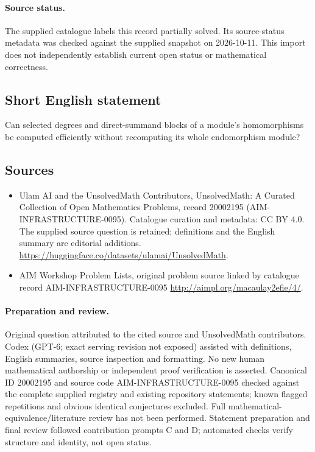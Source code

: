\documentclass[11pt]{article}
\begin{document}
\paragraph{Source status.}
The supplied catalogue labels this record partially solved. Its source-status metadata was checked against the supplied snapshot on 2026-10-11. This import does not independently establish current open status or mathematical correctness.
\subsection{Short English statement}
Can selected degrees and direct-summand blocks of a module's homomorphisms be computed efficiently without recomputing its whole endomorphism module?
\subsection{Sources}
\begin{itemize}
\item[\hypertarget{source:20002195:1}{S1}] Ulam AI and the UnsolvedMath Contributors, UnsolvedMath: A Curated Collection of Open Mathematics Problems, record 20002195 (AIM-INFRASTRUCTURE-0095). Catalogue curation and metadata: CC BY 4.0. The supplied source question is retained; definitions and the English summary are editorial additions.
\url{https://huggingface.co/datasets/ulamai/UnsolvedMath}.
\item[\hypertarget{source:20002195:2}{S2}] AIM Workshop Problem Lists, original problem source linked by catalogue record AIM-INFRASTRUCTURE-0095
\url{http://aimpl.org/macaulay2efie/4/}.
\end{itemize}
\paragraph{Preparation and review.}
Original question attributed to the cited source and UnsolvedMath contributors. Codex (GPT-6; exact serving revision not exposed) assisted with definitions, English summaries, source inspection and formatting. No new human mathematical authorship or independent proof verification is asserted. Canonical ID 20002195 and source code AIM-INFRASTRUCTURE-0095 checked against the complete supplied registry and existing repository statements; known flagged repetitions and obvious identical conjectures excluded. Full mathematical-equivalence/literature review has not been performed. Statement preparation and final review followed contribution prompts C and D; automated checks verify structure and identity, not open status.
\label{end:20002195}
\end{document}
